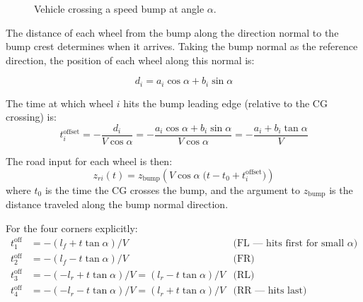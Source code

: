 \documentclass[11pt]{article}
\begin{document}
\begin{figure}[h]
\centering
{}
\caption{Vehicle crossing a speed bump at angle $\alpha$.}
\end{figure}

The distance of each wheel from the bump along the direction normal to the bump crest determines when it arrives. Taking the bump normal as the reference direction, the position of each wheel along this normal is:

\begin{equation}
d_i = a_i \cos\alpha + b_i \sin\alpha
\end{equation}

The time at which wheel $i$ hits the bump leading edge (relative to the CG crossing) is:
\begin{equation}
t_i^{\text{offset}} = -\frac{d_i}{V\cos\alpha} = -\frac{a_i \cos\alpha + b_i\sin\alpha}{V\cos\alpha} = -\frac{a_i + b_i\tan\alpha}{V}
\end{equation}

The road input for each wheel is then:
\begin{equation}
\boxed{z_{ri}(t) = z_{\text{bump}}\!\left(V\cos\alpha\;\bigl(t - t_0 + t_i^{\text{offset}}\bigr)\right)}
\label{eq:bump_angle}
\end{equation}
where $t_0$ is the time the CG crosses the bump, and the argument to $z_{\text{bump}}$ is the distance traveled along the bump normal direction.

For the four corners explicitly:
\begin{align}
t_1^{\text{off}} &= -(l_f + t\tan\alpha)/V  & \text{(FL --- hits first for small } \alpha) \\
t_2^{\text{off}} &= -(l_f - t\tan\alpha)/V  & \text{(FR)} \\
t_3^{\text{off}} &= -(-l_r + t\tan\alpha)/V = (l_r - t\tan\alpha)/V & \text{(RL)} \\
t_4^{\text{off}} &= -(-l_r - t\tan\alpha)/V = (l_r + t\tan\alpha)/V & \text{(RR --- hits last)}
\end{align}
\end{document}
